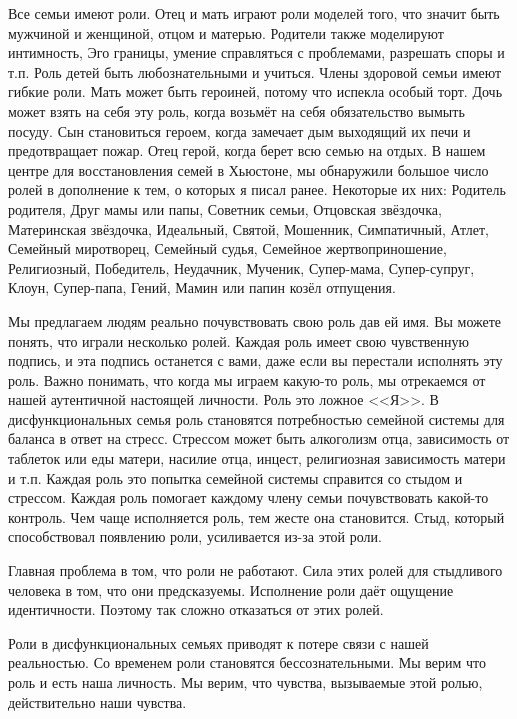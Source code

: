 \documentclass[10pt, fleqn]{article}
\begin{document}
Все семьи имеют роли. Отец и мать играют роли моделей того, что значит быть мужчиной и женщиной, отцом и матерью. Родители также моделируют интимность, Эго границы, умение справляться с проблемами, разрешать споры и т.п. Роль детей быть любознательными и учиться. Члены здоровой семьи имеют гибкие роли. Мать может быть героиней, потому что испекла особый торт. Дочь может взять на себя эту роль, когда возьмёт на себя обязательство вымыть посуду. Сын становиться героем, когда замечает дым выходящий их печи и предотвращает пожар. Отец герой, когда берет всю семью на отдых.
В нашем центре для восстановления семей в Хьюстоне, мы обнаружили большое число ролей в дополнение к тем, о которых я писал ранее. Некоторые их них: Родитель родителя, Друг мамы или папы, Советник семьи, Отцовская звёздочка, Материнская звёздочка, Идеальный, Святой, Мошенник, Симпатичный, Атлет, Семейный миротворец, Семейный судья, Семейное жертвоприношение, Религиозный, Победитель, Неудачник, Мученик, Супер-мама, Супер-супруг, Клоун, Супер-папа, Гений, Мамин или папин козёл отпущения.

Мы предлагаем людям реально почувствовать свою роль дав ей имя. Вы можете понять, что играли несколько ролей. Каждая роль имеет свою чувственную подпись, и эта подпись останется с вами, даже если вы перестали исполнять эту роль.
Важно понимать, что когда мы играем какую-то роль, мы отрекаемся от нашей аутентичной настоящей личности. Роль это ложное <<Я>>. В дисфункциональных семья роль становятся потребностью семейной системы для баланса в ответ на стресс. Стрессом может быть алкоголизм отца, зависимость от таблеток или еды матери, насилие отца, инцест, религиозная зависимость матери и т.п. Каждая роль это попытка семейной системы справится со стыдом и стрессом. Каждая роль помогает каждому члену семьи почувствовать какой-то контроль. Чем чаще исполняется роль, тем жесте она становится. Стыд, который способствовал появлению роли, усиливается из-за этой роли.

Главная проблема в том, что роли не работают. Сила этих ролей для стыдливого человека в том, что они предсказуемы. Исполнение роли даёт ощущение идентичности. Поэтому так сложно отказаться от этих ролей.

Роли в дисфункциональных семьях приводят к потере связи с нашей реальностью. Со временем роли становятся бессознательными. Мы верим что роль и есть наша личность. Мы верим, что чувства, вызываемые этой ролью, действительно наши чувства.

\end{document}
